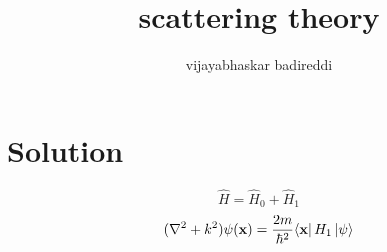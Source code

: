\documentclass[12pt]{article}
\title{scattering theory}
\author{vijayabhaskar badireddi}
\date{}
\begin{document}
\section*{Solution}
\[\hat{H}=\hat{H}_0+\hat{H}_1\]
\[(\laplacian + k^2)\psi(\mathbf{x}) = \frac{2m}{\hbar^2}\langle \mathbf{x} \vert\,H_1\,\vert \psi\rangle\]
\end{document}
